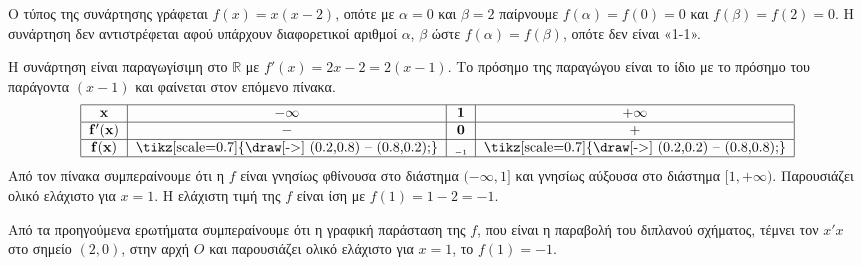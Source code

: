 \begin{alist}
    \item Ο τύπος της συνάρτησης γράφεται $f(x)=x(x-2)$, οπότε με $\alpha=0$ και $\beta=2$ παίρνουμε $f(\alpha)=f(0)=0$ και $f(\beta)=f(2)=0$.
    Η συνάρτηση δεν αντιστρέφεται αφού υπάρχουν διαφορετικοί αριθμοί $\alpha$, $\beta$ ώστε $f(\alpha)=f(\beta)$, οπότε δεν είναι «1-1». 
    \item Η συνάρτηση είναι παραγωγίσιμη στο $\mathbb{R}$ με $f'(x)=2x-2=2(x-1)$.
    Το πρόσημο της παραγώγου είναι το ίδιο με το πρόσημο του παράγοντα $(x-1)$ και φαίνεται στον επόμενο πίνακα.
    \[
    \begin{tabular}{|c|c|c|c|}
        \hline
        $\mathbf{x}$ & $-\mathbf{\infty}$ & $\mathbf{1}$ & $+\mathbf{\infty}$ \\
        \hline
        $\mathbf{f'(x)}$ & $-$ & $\mathbf{0}$ & $+$ \\
        \hline
        $\mathbf{f(x)}$ & \tikz[scale=0.7]{\draw[->] (0.2,0.8) -- (0.8,0.2);} & \raisebox{-0.5ex}{\text{\tiny $-1$}} & \tikz[scale=0.7]{\draw[->] (0.2,0.2) -- (0.8,0.8);} \\
        \hline
    \end{tabular}
    \]
    Από τον πίνακα συμπεραίνουμε ότι η $f$ είναι γνησίως φθίνουσα στο διάστημα $(-\infty, 1]$ και γνησίως αύξουσα στο διάστημα $[1, +\infty)$. Παρουσιάζει ολικό ελάχιστο για $x=1$.
    Η ελάχιστη τιμή της $f$ είναι ίση με $f(1)=1-2=-1$. 
    \item Από τα προηγούμενα ερωτήματα συμπεραίνουμε ότι η γραφική παράσταση της $f$, που είναι η παραβολή του διπλανού σχήματος, τέμνει τον $x'x$ στο σημείο $(2, 0)$, στην αρχή $O$ και παρουσιάζει ολικό ελάχιστο για $x=1$, το $f(1)=-1$. 
\end{alist}